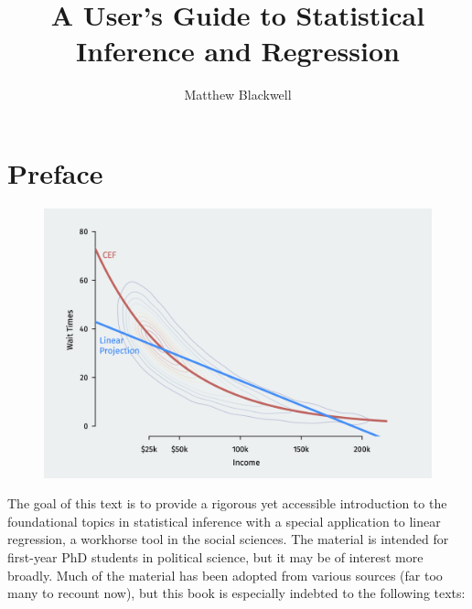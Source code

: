 \documentclass[
  letterpaper,
  DIV=11,
  numbers=noendperiod]{scrreprt}
\title{A User's Guide to Statistical Inference and Regression}
\author{Matthew Blackwell}
\date{}
\renewcommand*\contentsname{Table of contents}
\newcommand\contentsname{Table of contents}
\theoremstyle{plain}
\theoremstyle{definition}
\theoremstyle{definition}
\theoremstyle{remark}
\begin{document}
\maketitle
\ifdefined\Shaded\renewenvironment{Shaded}{\begin{tcolorbox}[boxrule=0pt, frame hidden, breakable, sharp corners, enhanced, interior hidden, borderline west={3pt}{0pt}{shadecolor}]}{\end{tcolorbox}}\fi

\renewcommand*\contentsname{Table of contents}
{
\hypersetup{linkcolor=}
\setcounter{tocdepth}{2}
\tableofcontents
}

\hypertarget{preface}{%
\chapter*{Preface}\label{preface}}


\begin{figure}[th]

{\centering \includegraphics{assets/img/linear-approximation.png}

}

\end{figure}

The goal of this text is to provide a rigorous yet accessible
introduction to the foundational topics in statistical inference with a
special application to linear regression, a workhorse tool in the social
sciences. The material is intended for first-year PhD students in
political science, but it may be of interest more broadly. Much of the
material has been adopted from various sources (far too many to recount
now), but this book is especially indebted to the following texts:
\end{document}
